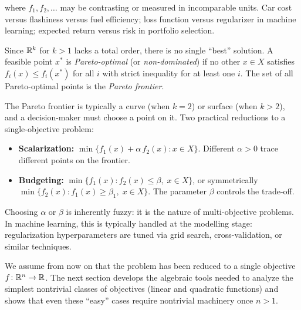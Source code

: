 where $f_1, f_2, \dots$ may be contrasting or measured in incomparable units.
Car cost versus flashiness versus fuel efficiency; loss function versus regularizer in machine learning; expected return versus risk in portfolio selection.

\begin{definition}\label{def:pareto}
	Since $\mathbb{R}^k$ for $k > 1$ lacks a total order, there is no single ``best'' solution.
	A feasible point $x^*$ is \emph{Pareto-optimal} (or \emph{non-dominated}) if no other $x \in X$ satisfies
	$f_i(x) \leq f_i(x^*)$ for all $i$ with strict inequality for at least one $i$.
	The set of all Pareto-optimal points is the \emph{Pareto frontier}.
\end{definition}

The Pareto frontier is typically a curve (when $k = 2$) or surface (when $k > 2$), and a decision-maker must choose a point on it.
Two practical reductions to a single-objective problem:
\begin{itemize}
	\item \textbf{Scalarization:} $\min\{f_1(x) + \alpha\, f_2(x) : x \in X\}$.
		Different $\alpha > 0$ trace different points on the frontier.
	\item \textbf{Budgeting:} $\min\{f_1(x) : f_2(x) \leq \beta,\; x \in X\}$, or symmetrically $\min\{f_2(x) : f_1(x) \geq \beta_1,\; x \in X\}$.
		The parameter $\beta$ controls the trade-off.
\end{itemize}
Choosing $\alpha$ or $\beta$ is inherently fuzzy: it is the nature of multi-objective problems.
In machine learning, this is typically handled at the modelling stage: regularization hyperparameters are tuned via grid search, cross-validation, or similar techniques.

We assume from now on that the problem has been reduced to a single objective $f \colon \mathbb{R}^n \to \mathbb{R}$.
The next section develops the algebraic tools needed to analyze the simplest nontrivial classes of objectives (linear and quadratic functions) and shows that even these ``easy'' cases require nontrivial machinery once $n > 1$.